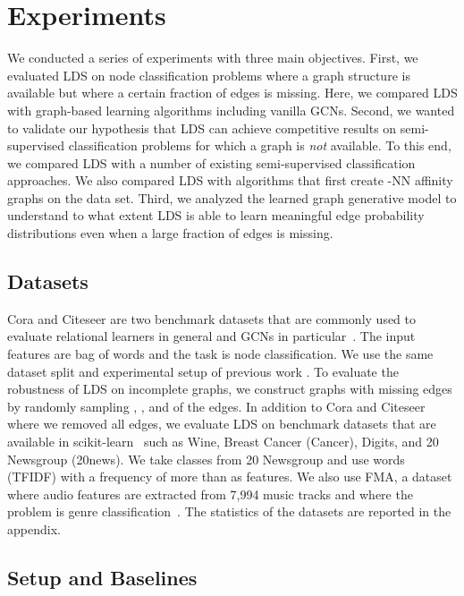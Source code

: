 \documentclass{article}
\newcommand{\lds}{\textsc{LDS}\xspace}
\begin{document}
\section{Experiments} \label{sec:experiments}



We conducted a series of experiments with three main objectives. First, we evaluated \lds on node classification problems where a graph structure is available but where a certain fraction of edges is missing.  
Here, we compared \lds with graph-based learning algorithms including vanilla GCNs.
Second, we wanted to validate our hypothesis that \lds can achieve competitive results on semi-supervised classification problems for which a graph is \emph{not} available. 
To this end, we compared \lds with a number of existing semi-supervised classification approaches. We also compared \lds with algorithms that first create -NN affinity graphs on the data set.  Third, we analyzed the learned graph generative model to understand to what extent \lds is able to learn meaningful edge probability distributions even when a large fraction of edges is missing.  


\subsection{Datasets}

Cora and Citeseer are two benchmark datasets that are commonly used to evaluate relational learners in general and GCNs in particular~\citep{sen2008collective}. The input features are bag of words and the task is node classification. 
We use the same dataset split and experimental setup of previous work \citep{yang2016revisiting, kipf2016semi}.
To evaluate the robustness of \lds on incomplete graphs, we construct graphs with missing edges by randomly sampling , , and  of the edges. 
In addition to Cora and Citeseer where we removed all edges, we evaluate \lds on  benchmark datasets that are available in  scikit-learn~\citep{scikit-learn} such as Wine, Breast Cancer (Cancer), Digits, and 20 Newsgroup (20news). We take  classes from 20 Newsgroup and use words (TFIDF) with a frequency of more than  as features. 
We also use FMA, a dataset where  audio features are extracted from 7,994 music tracks and where the problem is genre classification~\citep{fma_dataset}. The statistics of the datasets are reported in the appendix.



\subsection{Setup and Baselines}
\end{document}
